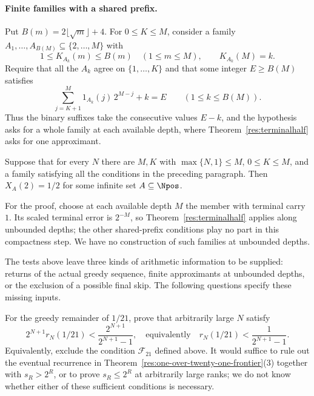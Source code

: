 \documentclass[11pt]{article}
\begin{document}
\paragraph{Finite families with a shared prefix.}
Put $B(m)=2\lfloor\sqrt m\rfloor+4$.  For $0\le K\le M$, consider a
family $A_1,\ldots,A_{B(M)}\subseteq\{2,\ldots,M\}$ with
\[
 1\le K_{A_k}(m)\le B(m)\quad(1\le m\le M),
 \qquad K_{A_k}(M)=k.
\]
Require that all the $A_k$ agree on $\{1,\ldots,K\}$ and that some
integer $E\ge B(M)$ satisfies
\[
 \sum_{j=K+1}^{M}1_{A_k}(j)\,2^{M-j}+k=E
 \qquad(1\le k\le B(M)).
\]
Thus the binary suffixes take the consecutive values $E-k$, and the
hypothesis asks for a whole family at each available depth, where
Theorem~\ref{res:terminalhalf} asks for one approximant.

\begin{theorem}
\label{res:cylinderhalf}
Suppose that for every $N$ there are $M,K$ with
$\max\{N,1\}\le M$, $0\le K\le M$, and a family satisfying all the
conditions in the preceding paragraph.  Then $X_A(2)=1/2$ for some
infinite set $A\subseteq\Npos$.
\end{theorem}

For the proof, choose at each available depth $M$ the member with
terminal carry $1$. Its scaled terminal error is $2^{-M}$, so
Theorem~\ref{res:terminalhalf} applies along unbounded depths; the
other shared-prefix conditions play no part in this compactness step.
We have no construction of such families at unbounded depths.

The tests above leave three kinds of arithmetic information to be
supplied: returns of the actual greedy sequence, finite approximants at
unbounded depths, or the exclusion of a possible final skip. The
following questions specify these missing inputs.

\begin{problem}
\label{prob:one-over-twenty-one-membership}
For the greedy remainder of $1/21$, prove that arbitrarily large $N$
satisfy
\[
 2^{N+1}r_N(1/21)<\frac{2^{N+1}}{2^{N+1}-1},
 \quad\text{equivalently}\quad
 r_N(1/21)<\frac1{2^{N+1}-1}.
\]
Equivalently, exclude the condition $\mathcal F_{21}$ defined above.
It would suffice to rule out the eventual recurrence in
Theorem~\ref{res:one-over-twenty-one-frontier}(3) together with
$s_R>2^R$, or to prove $s_R\le2^R$ at arbitrarily large ranks; we do
not know whether either of these sufficient conditions is necessary.
\end{problem}
\end{document}
